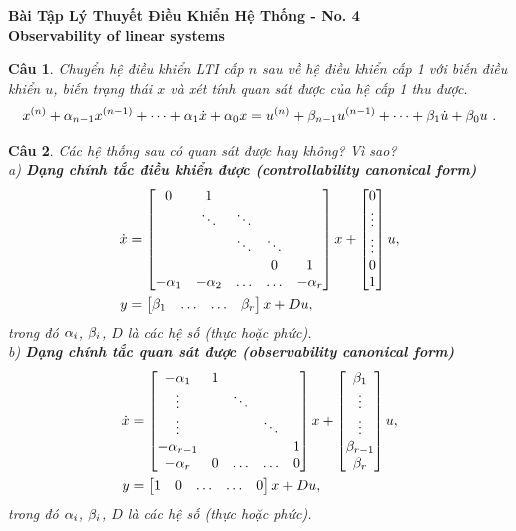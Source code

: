 \documentclass[11pt]{article}
\newtheorem{bt}{Câu}
\begin{document}



\begin{center}
	{\bf Bài Tập Lý Thuyết Điều Khiển Hệ Thống - No. 4 \\
	     Observability of linear systems}
\end{center}

\begin{bt} 
	Chuyển hệ điều khiển LTI cấp $n$ sau về hệ điều khiển cấp 1 với biến điều khiển $u$, biến trạng thái $x$ và xét tính quan sát được của hệ cấp 1 thu được. \\
	\begin{equation}
		x^{(n)} + \a_{n-1} x^{(n-1)} + \dots + \a_1 \dot{x} + \a_0 x = 
		u^{(n)} + \b_{n-1} u^{(n-1)} + \dots + \b_1 \dot{u} + \b_0 u \ . 
	\end{equation} 
\end{bt}

\begin{bt}
Các hệ thống sau có quan sát được hay không? Vì sao? \\
\noindent	
a) \textbf{Dạng chính tắc điều khiển được (controllability canonical form)}
	\begin{align}
		\dot{x} &= \begin{bmatrix} 0 & 1 & &  & \\ &  \ddots & \ddots &  & \\ & & \ddots & \ddots &   \\&  &  & 0 & 1 \\ -\alpha_1 & -\alpha_2 & \dots & \dots & -\alpha_{r}  \end{bmatrix} x + \begin{bmatrix} 0 \\ \vdots \\ \vdots \\ 0 \\ 1 \end{bmatrix} u, \\
		y &= \begin{bmatrix} \beta_1 &  \dots & \dots & \beta_r \end{bmatrix} x + D u, 
	\end{align}
	trong đó $\alpha_i$, $\beta_i$, $D$ là các hệ số (thực hoặc phức). \\
\noindent	b) \textbf{Dạng chính tắc quan sát được (observability canonical form)}
	\begin{align}
		\dot{x} &= \begin{bmatrix} -\alpha_1 & 1 & &  & \\ \vdots &   & \ddots &  & \\ \vdots & & & \ddots &   \\ -\alpha_{r-1} &  &  &  & 1 \\ -\alpha_{r} & 0 & \dots & \dots & 0 \end{bmatrix} x + \begin{bmatrix} \beta_1 \\  \vdots \\ \vdots \\ \beta_{r-1} \\ \beta_r \end{bmatrix} u, \\
		y &= \begin{bmatrix} 1 &  0 & \dots & \dots & 0 \end{bmatrix} x + D u, 
	\end{align}
	trong đó $\alpha_i$, $\beta_i$, $D$ là các hệ số (thực hoặc phức). 
\end{bt}
\end{document}
